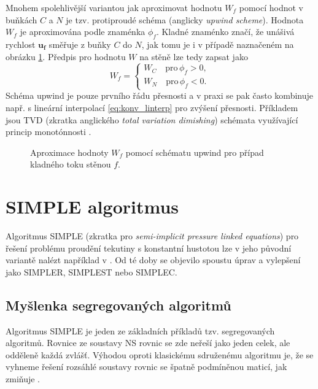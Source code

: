 Mnohem spolehlivější variantou jak aproximovat hodnotu $ W_f $ pomocí hodnot v buňkách $ C $ a $ N $ je tzv. protiproudé schéma (anglicky \textit{upwind scheme}). Hodnota $ W_f $ je aproximována podle znaménka $ \phi_f $. Kladné znaménko značí, že unášivá rychlost $ \mathbf{u_f} $ směřuje z buňky $ C $ do $ N $, jak tomu je i v případě naznačeném na obrázku \ref{fig:upwind}. Předpis pro hodnotu $ W $ na stěně lze tedy zapsat jako
\begin{equation}\label{eq:upwind}
W_f=
\begin{cases}
W_C \quad \text{pro}\, \phi_f>0,\\
W_N \quad \text{pro}\, \phi_f<0.
\end{cases}
\end{equation}
Schéma upwind je pouze prvního řádu přesnosti a v praxi se pak často kombinuje např. s lineární interpolací \ref{eq:konv_linterp} pro zvýšení přesnosti. Příkladem jsou TVD (zkratka anglického \textit{total variation dimishing}) schémata \cite{harten1983high, harten1984class} využívající princip monotónnosti \cite{godunov1959difference}.
\begin{figure}
	\def\svgwidth{0.85\textwidth}
	\graphicspath{{img/inkscape/}}
	
	\caption[Schéma upwind]{Aproximace hodnoty $ W_f $ pomocí schématu upwind pro případ kladného toku stěnou $ f $.}
	\label{fig:upwind}
\end{figure}


\section{SIMPLE algoritmus}\label{sec:simple}

Algoritmus SIMPLE (zkratka pro \textit{semi-implicit pressure linked equations}) pro řešení problému proudění tekutiny s konstantní hustotou lze v jeho původní variantě nalézt například v \cite{patankar1983calculation}. Od té doby se objevilo spoustu úprav a vylepšení jako SIMPLER\cite{anderson1997computational}, SIMPLEST nebo SIMPLEC\cite{van1984enhancements}. 

\subsection{Myšlenka segregovaných algoritmů}
Algoritmus SIMPLE je jeden ze základních příkladů tzv. segregovaných algoritmů. Rovnice ze soustavy NS rovnic se zde neřeší jako jeden celek, ale odděleně každá zvlášť. Výhodou oproti klasickému sdruženému algoritmu je, že se vyhneme řešení rozsáhlé soustavy rovnic se špatně podmíněnou maticí, jak zmiňuje \cite{furst2020mko2}. 

